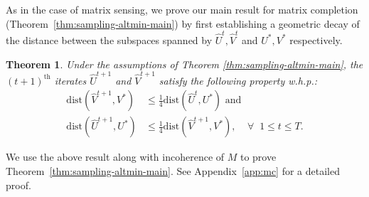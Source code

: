 \documentclass[11pt]{article}
\theoremstyle{plain}
\newtheorem{theorem}{Theorem}[section]
\theoremstyle{definition}
\newcommand{\dist}{\mathrm{dist}}
\newcommand{\Vw}{\widehat{V}}
\newcommand{\Uw}{\widehat{U}}
\begin{document}
As in the case of matrix sensing, we prove our main result for matrix completion (Theorem~\ref{thm:sampling-altmin-main}) by first establishing a geometric decay of the distance between the subspaces spanned by $\widehat{U}^{t}, \widehat{V}^{t}$ and $U^*,V^*$ respectively.
\begin{theorem}\label{thm:sampling-altmin-geomconv}
 Under the assumptions of Theorem \ref{thm:sampling-altmin-main}, the $(t+1)^{\textrm{th}}$ iterates $\Uw^{t+1}$ and $\Vw^{t+1}$
satisfy the following property w.h.p.:
\begin{align*}
 \dist\left(\Vw^{t+1}, V^*\right) &\leq \frac{1}{4} \dist\left(\Uw^{t}, U^*\right)  \mbox{ and } \\
 \dist\left(\Uw^{t+1}, U^*\right) &\leq \frac{1}{4} \dist\left(\Vw^{t+1}, V^*\right),\;\;\;\; \forall \;\;1 \leq t \leq T.
\end{align*}
\end{theorem}
We use the above result along with incoherence of $M$ to prove Theorem~\ref{thm:sampling-altmin-main}. See Appendix~\ref{app:mc} for a detailed proof. 
\end{document}
